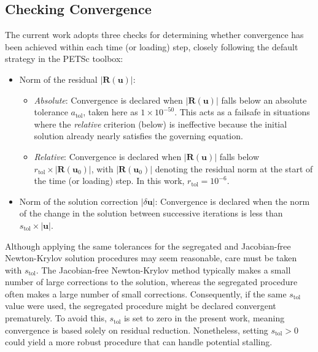 \documentclass[sn-mathphys,Numbered]{sn-jnl}%
\newcommand{\bb}{\boldsymbol}
\begin{document}
\subsection{Checking Convergence}
The current work adopts three checks for determining whether convergence has been achieved within each time (or loading) step, closely following the default strategy in the PETSc toolbox:
\begin{itemize}
    \item Norm of the residual $|\bb{R}(\bb{u})|$:
    \begin{itemize}
        \item \emph{Absolute}: Convergence is declared when $|\bb{R}(\bb{u})|$ falls below an absolute tolerance $a_{\text{tol}}$, taken here as $1\times 10^{-50}$. This acts as a failsafe in situations where the \emph{relative} criterion (below) is ineffective because the initial solution already nearly satisfies the governing equation.
        \item \emph{Relative}: Convergence is declared when $|\bb{R}(\bb{u})|$ falls below $r_{\text{tol}} \times |\bb{R}(\bb{u}_0)|$, with $|\bb{R}(\bb{u}_0)|$ denoting the residual norm at the start of the time (or loading) step. In this work, $r_{\text{tol}} = 10^{-6}$.
    \end{itemize}
    \item Norm of the solution correction $|\delta \bb{u}|$: Convergence is declared when the norm of the change in the solution between successive iterations is less than $s_{\text{tol}} \times |\bb{u}|$.
\end{itemize}

Although applying the same tolerances for the segregated and Jacobian-free Newton-Krylov solution procedures may seem reasonable, care must be taken with $s_{\text{tol}}$. The Jacobian-free Newton-Krylov method typically makes a small number of large corrections to the solution, whereas the segregated procedure often makes a large number of small corrections. Consequently, if the same $s_{\text{tol}}$ value were used, the segregated procedure might be declared convergent prematurely. To avoid this, $s_{\text{tol}}$ is set to zero in the present work, meaning convergence is based solely on residual reduction. Nonetheless, setting $s_{\text{tol}} > 0$ could yield a more robust procedure that can handle potential stalling.


\end{document}
